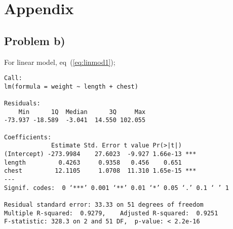 \documentclass[a4paper,11pt]{article}
\begin{document}


%
%

\clearpage
\appendix
\section{Appendix}
\label{sec:appendix}

\subsection{Problem b)}
\label{app:b}

For linear model, eq~(\ref{eq:linmod1});
{\footnotesize
    \begin{verbatim}
Call:
lm(formula = weight ~ length + chest)

Residuals:
    Min      1Q  Median      3Q     Max 
-73.937 -18.589  -3.041  14.550 102.055 

Coefficients:
             Estimate Std. Error t value Pr(>|t|)    
(Intercept) -273.9984    27.6023  -9.927 1.66e-13 ***
length         0.4263     0.9358   0.456    0.651    
chest         12.1105     1.0708  11.310 1.65e-15 ***
---
Signif. codes:  0 ‘***’ 0.001 ‘**’ 0.01 ‘*’ 0.05 ‘.’ 0.1 ‘ ’ 1

Residual standard error: 33.33 on 51 degrees of freedom
Multiple R-squared:  0.9279,    Adjusted R-squared:  0.9251 
F-statistic: 328.3 on 2 and 51 DF,  p-value: < 2.2e-16
 
    \end{verbatim}
}
\end{document}
